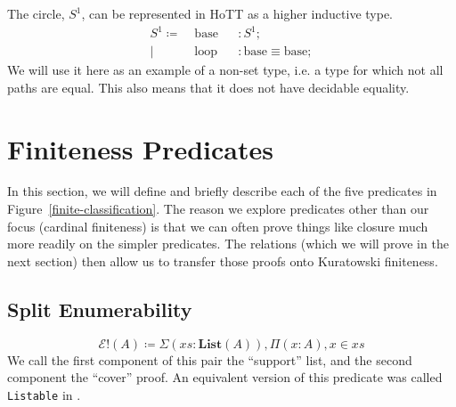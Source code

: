 \begin{romdefinition}[\(S^1\)] \label{circle-def}
  The circle, \(S^1\), can be represented in HoTT as a higher inductive type.
  \begin{equation}
    \begin{alignat}{5}
      S^1 \coloneqq & \; \text{base} &&: S^1 ; \\
                  | & \; \text{loop} &&: \text{base} \equiv \text{base} ; 
    \end{alignat}
  \end{equation}
  We will use it here as an example of a non-set type, i.e. a type for which not
  all paths are equal.
  This also means that it does not have decidable equality.
\end{romdefinition}
\section{Finiteness Predicates}
In this section, we will define and briefly describe each of the five predicates
in Figure~\ref{finite-classification}.
The reason we explore predicates other than our focus (cardinal finiteness) is
that we can often prove things like closure much more readily on the simpler
predicates.
The relations (which we will prove in the next section) then allow us to
transfer those proofs onto Kuratowski finiteness.
\subsection{Split Enumerability}
\begin{romdefinition} \label{split-enum-def}
  \begin{equation} \label{split-enum-def-eqn}
    \mathcal{E}!(A) \coloneqq \Sigma {(\mathit{xs} : \textbf{List}(A))} , \Pi {(x : A)} , x \in \mathit{xs}
  \end{equation}
  We call the first component of this pair the ``support'' list, and the second
  component the ``cover'' proof.
  An equivalent version of this predicate was called \verb+Listable+ in
  \cite{firsovDependentlyTypedProgramming2015}.
\end{romdefinition}

